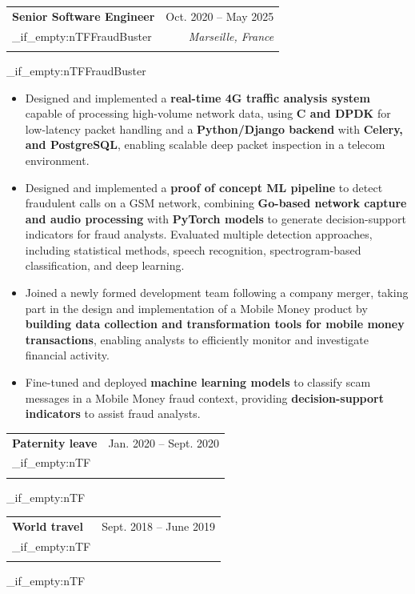 \documentclass[a4paper,11pt]{article}
\makeatletter
\newcommand{\resumeItem}[1]{
  \item\small{
    {#1 \vspace{-2pt}}
  }
}
\newcommand{\resumeSubheading}[4]{
  \vspace{-2pt}\item
    \begin{tabular*}{0.97\textwidth}[t]{l@{\extracolsep{\fill}}r}
      \textbf{#1} & #2 \\
      \tl_if_empty:nTF{#3}
        {}
        {\textit{\small#3} & \textit{\small #4} \\}
    \end{tabular*}\vspace{-7pt}
    \tl_if_empty:nTF{#3}{\par\vspace{5pt}}{}
}
\newcommand{\resumeSubSubheading}[2]{
    \item
    \begin{tabular*}{0.97\textwidth}{l@{\extracolsep{\fill}}r}
      \textit{\small#1} & \textit{\small #2} \\
    \end{tabular*}\vspace{-7pt}
}
\newcommand{\resumeSubHeadingListEnd}{\end{itemize}}
\newcommand{\resumeItemListStart}{\begin{itemize}}
\newcommand{\resumeItemListEnd}{\end{itemize}\vspace{-5pt}}
\makeatother
\begin{document}
    \resumeSubheading
      {Senior Software Engineer}{Oct. 2020 -- May 2025}
      {FraudBuster}{Marseille, France}
      \resumeItemListStart
        \resumeItem{Designed and implemented a \textbf{real-time 4G traffic analysis system} capable of processing high-volume network data, using \textbf{C and DPDK} for low-latency packet handling and a \textbf{Python/Django backend} with \textbf{Celery, and PostgreSQL}, enabling scalable deep packet inspection in a telecom environment.}
        \resumeItem{Designed and implemented a \textbf{proof of concept ML pipeline} to detect fraudulent calls on a GSM network, combining \textbf{Go-based network capture and audio processing} with \textbf{PyTorch models} to generate decision-support indicators for fraud analysts. Evaluated multiple detection approaches, including statistical methods, speech recognition, spectrogram-based classification, and deep learning.}
        \resumeItem{Joined a newly formed development team following a company merger, taking part in the design and implementation of a Mobile Money product by \textbf{building data collection and transformation tools for mobile money transactions}, enabling analysts to efficiently monitor and investigate financial activity.}
        \resumeItem{Fine-tuned and deployed \textbf{machine learning models} to classify scam messages in a Mobile Money fraud context, providing \textbf{decision-support indicators} to assist fraud analysts.}
      \resumeItemListEnd


    \resumeSubheading
      {Paternity leave}{Jan. 2020 -- Sept. 2020}
      {}{}

    \resumeSubheading
      {World travel}{Sept. 2018 -- June 2019}
      {}{}
\end{document}
